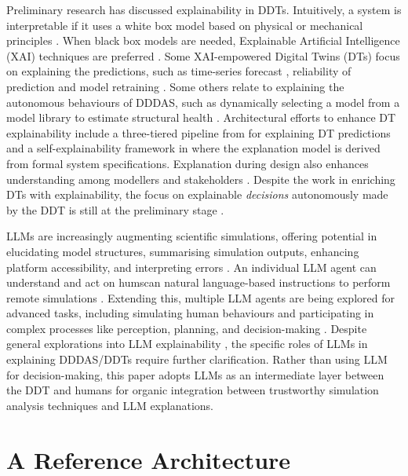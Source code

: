 \documentclass[runningheads]{llncs}
\begin{document}
Preliminary research has discussed explainability in DDTs. 
Intuitively, a system is interpretable if it uses a white box model based on physical or mechanical principles \cite{vilar-dias_interpretable_2024}. 
When black box models are needed, Explainable Artificial Intelligence (XAI) techniques are preferred \cite{zhang_explainable_2024}. 
Some XAI-empowered Digital Twins (DTs) focus on explaining the predictions, such as time-series forecast \cite{neupane_twinexplainer_2023}, reliability of prediction and model retraining \cite{an_explainable_2023}.
Some others relate to explaining the autonomous behaviours of DDDAS, such as dynamically selecting a model from a model library to estimate structural health \cite{kapteyn_toward_2020}.
Architectural efforts to enhance DT explainability include a three-tiered pipeline from \cite{neupane_twinexplainer_2023} for explaining DT predictions and a self-explainability framework in \cite{michael_explaining_2024} where the explanation model is derived from formal system specifications.
Explanation during design also enhances understanding among modellers and stakeholders \cite{wang_explainable_2021}.
Despite the work in enriching DTs with explainability, the focus on explainable \textit{decisions} autonomously made by the DDT is still at the preliminary stage \cite{zhang_explainable_2024,kapteyn_toward_2020,michael_explaining_2024}.



LLMs are increasingly augmenting scientific simulations, offering potential in elucidating model structures, summarising simulation outputs, enhancing platform accessibility, and interpreting errors \cite{giabbanelli_gpt-based_2024}.
An individual LLM agent can understand and act on humscan natural language-based instructions to perform remote simulations \cite{cao2024llmassisted}. Extending this, multiple LLM agents are being explored for advanced tasks, including simulating human behaviours \cite{yang_llm-based_2024} and participating in complex processes like perception, planning, and decision-making \cite{sun_empowering_2024}. 
Despite general explorations into LLM explainability \cite{zhao_explainability_2024}, the specific roles of LLMs in explaining DDDAS/DDTs require further clarification.
Rather than using LLM for decision-making, this paper adopts LLMs as an intermediate layer between the DDT and humans for organic integration between trustworthy simulation analysis techniques and LLM explanations. 


\section{A Reference Architecture} \label{sec:arch}
\end{document}
